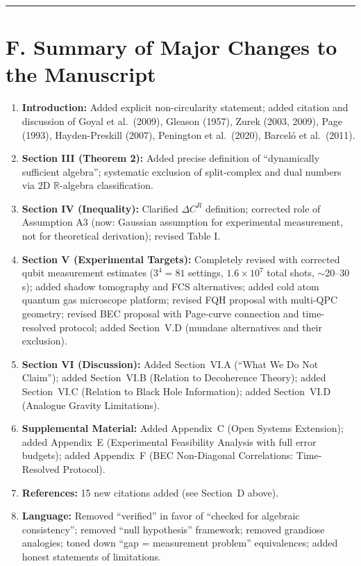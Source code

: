 \documentclass[11pt,a4paper]{article}
\begin{document}
\vspace{1em}
\hrule
\vspace{1em}

\section*{F. Summary of Major Changes to the Manuscript}

\begin{enumerate}[leftmargin=*]
\item \textbf{Introduction:} Added explicit non-circularity statement; added citation and discussion of Goyal et al.\ (2009), Gleason (1957), Zurek (2003, 2009), Page (1993), Hayden-Preskill (2007), Penington et al.\ (2020), Barcel\'o et al.\ (2011).
\item \textbf{Section III (Theorem 2):} Added precise definition of ``dynamically sufficient algebra''; systematic exclusion of split-complex and dual numbers via 2D $\mathbb{R}$-algebra classification.
\item \textbf{Section IV (Inequality):} Clarified $\Delta C^R$ definition; corrected role of Assumption A3 (now: Gaussian assumption for experimental measurement, not for theoretical derivation); revised Table I.
\item \textbf{Section V (Experimental Targets):} Completely revised with corrected qubit measurement estimates ($3^4=81$ settings, $1.6\times 10^7$ total shots, $\sim$20--30\,s); added shadow tomography and FCS alternatives; added cold atom quantum gas microscope platform; revised FQH proposal with multi-QPC geometry; revised BEC proposal with Page-curve connection and time-resolved protocol; added Section~V.D (mundane alternatives and their exclusion).
\item \textbf{Section VI (Discussion):} Added Section~VI.A (``What We Do Not Claim''); added Section~VI.B (Relation to Decoherence Theory); added Section~VI.C (Relation to Black Hole Information); added Section~VI.D (Analogue Gravity Limitations).
\item \textbf{Supplemental Material:} Added Appendix~C (Open Systems Extension); added Appendix~E (Experimental Feasibility Analysis with full error budgets); added Appendix~F (BEC Non-Diagonal Correlations: Time-Resolved Protocol).
\item \textbf{References:} 15 new citations added (see Section~D above).
\item \textbf{Language:} Removed ``verified'' in favor of ``checked for algebraic consistency''; removed ``null hypothesis'' framework; removed grandiose analogies; toned down ``gap = measurement problem'' equivalences; added honest statements of limitations.
\end{enumerate}
\end{document}
